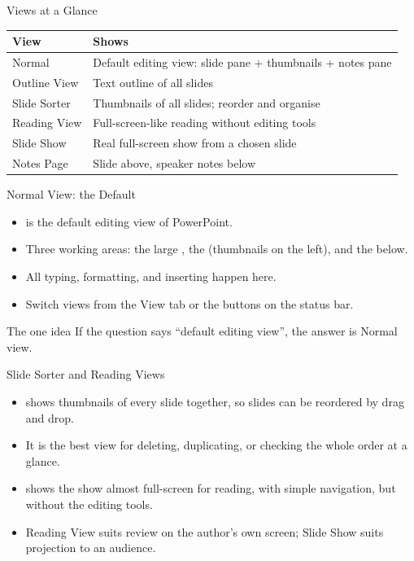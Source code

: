 \documentclass[aspectratio=169]{beamer}
\begin{document}
\begin{frame}{Views at a Glance}
  \begin{center}
    \begin{tabular}{p{}p{}}
      \toprule
      \textbf{View} & \textbf{Shows} \\
      \midrule
      Normal & Default editing view: slide pane + thumbnails + notes pane \\
      Outline View & Text outline of all slides \\
      Slide Sorter & Thumbnails of all slides; reorder and organise \\
      Reading View & Full-screen-like reading without editing tools \\
      Slide Show & Real full-screen show from a chosen slide \\
      Notes Page & Slide above, speaker notes below \\
      \bottomrule
    \end{tabular}
  \end{center}
  \vspace{0.25cm}
\end{frame}

\begin{frame}{Normal View: the Default}
  \begin{itemize}
    \item {} is the default editing view of PowerPoint.
    \item Three working areas: the large , the
       (thumbnails on the left), and the
       below.
    \item All typing, formatting, and inserting happen here.
    \item Switch views from the View tab or the buttons on the status bar.
  \end{itemize}
  \begin{block}{The one idea}
    If the question says ``default editing view'', the answer is Normal view.
  \end{block}
\end{frame}

\begin{frame}{Slide Sorter and Reading Views}
  \begin{itemize}
    \item {} shows thumbnails of every slide together, so
      slides can be reordered by drag and drop.
    \item It is the best view for deleting, duplicating, or checking the whole
      order at a glance.
    \item {} shows the show almost full-screen for reading,
      with simple navigation, but without the editing tools.
    \item Reading View suits review on the author's own screen; Slide Show
      suits projection to an audience.
  \end{itemize}
\end{frame}
\end{document}
